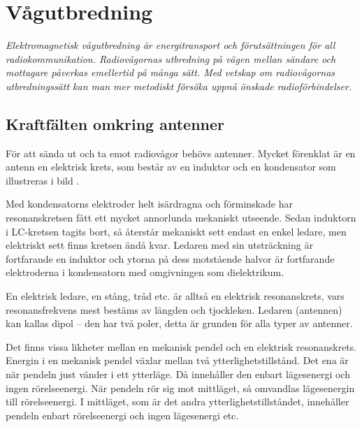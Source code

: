 \chapter{Vågutbredning}
\label{vaagutbredning}

\noindent\emph{Elektromagnetisk vågutbredning är energitransport och
  förutsättningen för all radiokommunikation.
  Radiovågornas utbredning på vägen mellan sändare och mottagare påverkas
  emellertid på många sätt.
  Med vetskap om radiovågornas utbredningssätt kan man mer
  metodiskt försöka uppnå önskade radioförbindelser.}

\section[Kraftfält antenner]{Kraftfälten omkring antenner}

För att sända ut och ta emot radiovågor behövs antenner.
Mycket förenklat är en antenn en elektrisk krets, som består av en induktor
och en kondensator som illustreras i bild .

Med kondensatorns elektroder helt isärdragna och förminskade har
resonanskretsen fått ett mycket annorlunda mekaniskt utseende.
Sedan induktorn i LC-kretsen tagits bort, så återstår mekaniskt sett endast
en enkel ledare, men elektriskt sett finns kretsen ändå kvar.
Ledaren med sin utsträckning är fortfarande en induktor och ytorna på dess
motstående halvor är fortfarande elektroderna i kondensatorn med
omgivningen som dielektrikum.

En elektrisk ledare, en stång, tråd etc. är alltså en elektrisk
resonanskrets, vars resonansfrekvens mest bestäms av längden och
tjockleken. Ledaren (antennen) kan kallas dipol -- den har två poler,
detta är grunden för alla typer av antenner.


Det finns vissa likheter mellan en mekanisk pendel och en elektrisk
resonanskrets.
%
Energin i en mekanisk pendel växlar mellan två ytterlighetstillstånd.
Det ena är när pendeln just vänder i ett ytterläge.
Då innehåller den enbart lägesenergi och ingen rörelseenergi.
När pendeln rör sig mot mittläget, så omvandlas lägesenergin till rörelseenergi.
I mittläget, som är det andra ytterlighetstillståndet, innehåller pendeln enbart
rörelseenergi och ingen lägesenergi etc.

